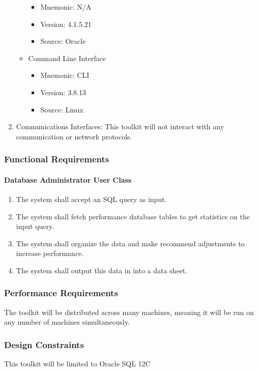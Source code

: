 \documentclass[draftclsnofoot, onecolumn, compsoc, 10pt]{IEEEtran}
\begin{document}
\begin{enumerate}
\begin{itemize}
	 \begin{itemize}
		\item Mnemonic: N/A
        \item Version: 4.1.5.21
        \item Source: Oracle
     \end{itemize}
     \item Command Line Interface
	 \begin{itemize}
		\item Mnemonic: CLI
        \item Version: 3.8.13
        \item Source: Linux
	 \end{itemize}
	 \end{itemize}
     \item Communications Interfaces: This toolkit will not  interact with any communication or network protocols.
\end{enumerate}

\subsubsection{Functional Requirements}

\paragraph{Database Administrator User Class}
\begin{enumerate}
  \item The system shall accept an SQL query as input.
  \item The system shall fetch performance database tables to get statistics on the input query.
  \item The system shall organize the data and make recommend adjustments to increase performance.
  \item The system shall output this data in into a data sheet.
\end{enumerate}

\subsubsection{Performance Requirements}
The toolkit will be distributed across many machines, meaning it will be run on any number of machines simultaneously.

\subsubsection{Design Constraints}
This toolkit will be limited to Oracle SQL 12C
\end{document}
